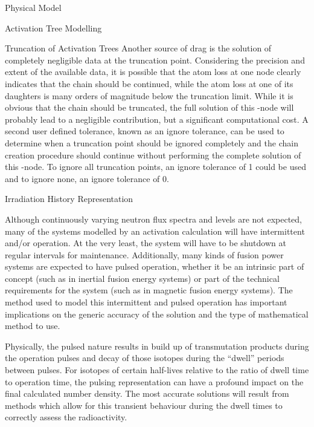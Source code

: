 \begin{chapter}{Physical Model\label{chap:physical}}
\begin{section}{Activation Tree Modelling\label{sec:physical.chains}}
\begin{subsection}{Truncation of Activation Trees}
    Another source of drag is the solution of completely negligible
    data at the truncation point.  Considering the precision and
    extent of the available data, it is possible that the atom loss at
    one node clearly indicates that the chain should be continued,
    while the atom loss at one of its daughters is many orders of
    magnitude below the truncation limit.  While it is obvious that
    the chain should be truncated, the full solution of this \pc-node
    will probably lead to a negligible contribution, but a significant
    computational cost.  A second user defined tolerance, known as an
    ignore tolerance, can be used to determine when a truncation point
    should be ignored completely and the chain creation procedure
    should continue without performing the complete solution of this
    \pc-node.  To ignore all truncation points, an ignore tolerance of
    1 could be used and to ignore none, an ignore tolerance of 0.
    
  \end{subsection}
\end{section}

\begin{section}{Irradiation History Representation}
  
  Although continuously varying neutron flux spectra and levels are
  not expected, many of the systems modelled by an activation
  calculation will have intermittent and/or operation.  At the very
  least, the system will have to be shutdown at regular intervals for
  maintenance.  Additionally, many kinds of fusion power systems are
  expected to have pulsed operation, whether it be an intrinsic part
  of concept (such as in inertial fusion energy systems) or part of
  the technical requirements for the system (such as in magnetic
  fusion energy systems).  The method used to model this intermittent
  and pulsed operation has important implications on the generic
  accuracy of the solution and the type of mathematical method to use.
  
  Physically, the pulsed nature results in build up of transmutation
  products during the operation pulses and decay of those isotopes
  during the ``dwell'' periods between pulses.  For isotopes of
  certain half-lives relative to the ratio of dwell time to operation
  time, the pulsing representation can have a profound impact on the
  final calculated number density.  The most accurate solutions will
  result from methods which allow for this transient behaviour during
  the dwell times to correctly assess the radioactivity.
  

\end{section}
\end{chapter}
